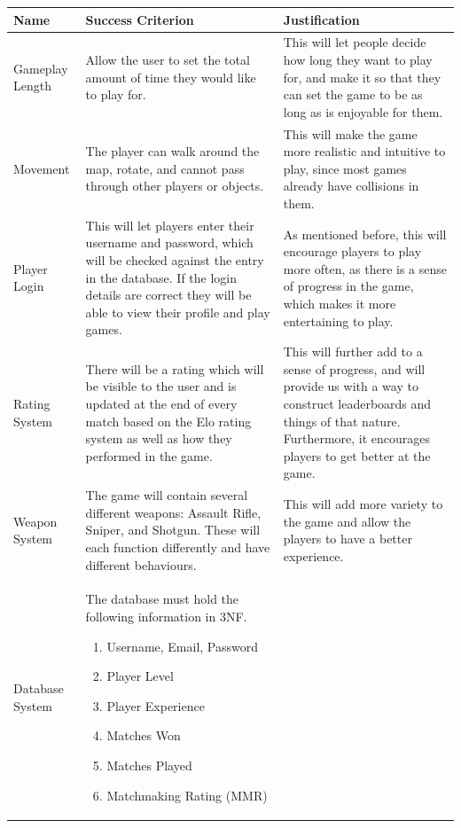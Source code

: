 \begin{center}
\begin{longtable}[c]{|p{2.7cm}|p{6.7cm}|p{5.7cm}|}
    \hline
    Name & Success Criterion & Justification\\
    \hline
    \hline
    Gameplay Length & Allow the user to set the total amount of time they would like to play for. & This will let people decide how long they want to play for, and make it so that they can set the game to be as long as is enjoyable for them.\\
    \hline
    Movement & The player can walk around the map, rotate, and cannot pass through other players or objects. & This will make the game more realistic and intuitive to play, since most games already have collisions in them.\\
    \hline
    Player Login & This will let players enter their username and password, which will be checked against the entry in the database. If the login details are correct they will be able to view their profile and play games. & As mentioned before, this will encourage players to play more often, as there is a sense of progress in the game, which makes it more entertaining to play.\\
    \hline
    Rating System & There will be a rating which will be visible to the user and is updated at the end of every match based on the Elo rating system as well as how they performed in the game. & This will further add to a sense of progress, and will provide us with a way to construct leaderboards and things of that nature. Furthermore, it encourages players to get better at the game.\\
    \hline
    Weapon System & The game will contain several different weapons: Assault Rifle, Sniper, and Shotgun. These will each function differently and have different behaviours. & This will add more variety to the game and allow the players to have a better experience.\\
    \hline
    Database System & The database must hold the following information in 3NF.
    \begin{enumerate}
        \item Username, Email, Password
        \item Player Level
        \item Player Experience
        \item Matches Won
        \item Matches Played
        \item Matchmaking Rating (MMR)

\end{enumerate}
\end{longtable}
\end{center}
